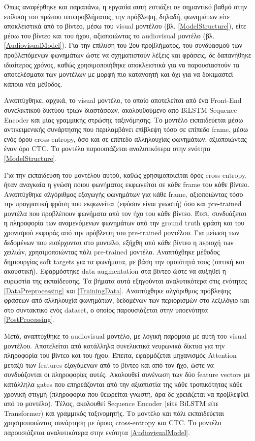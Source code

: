 Όπως αναφέρθηκε και παραπάνω, η εργασία αυτή εστιάζει σε σημαντικό βαθμό στην επίλυση του πρώτου υποπροβλήματος, την πρόβλεψη, δηλαδή, φωνημάτων είτε αποκλειστικά από το βίντεο, μέσω του visual μοντέλου (βλ. \ref{ModelStructure}), είτε μέσω του βίντεο και του ήχου, αξιοποιώντας το audiovisual μοντέλο (βλ. \ref{AudiovisualModel}). Για την επίλυση του 2ου προβλήματος, του συνδυασμού των προβλεπόμενων φωνημάτων ώστε να σχηματιστούν λέξεις και φράσεις, δε δαπανήθηκε ιδιαίτερος χρόνος, καθώς χρησιμοποιήθηκε αποκλειστικά για να παρουσιαστούν τα αποτελέσματα των μοντέλων με μορφή πιο κατανοητή και όχι για να δοκιμαστεί κάποια νέα μέθοδος.

Αναπτύχθηκε, αρχικά, το visual μοντέλο, το οποίο αποτελείται από ένα Front-End συνελικτικού δικτύου τριών διαστάσεων, ακολουθούμενο από BiLSTM Sequence Encoder και μίας γραμμικής στρώσης ταξινόμησης. Το μοντέλο εκπαιδεύεται μέσω αντικειμενικής συνάρτησης που περιλαμβάνει επίβλεψη τόσο σε επίπεδο frame, μέσω ενός όρου cross-entropy, όσο και σε επίπεδο αλληλουχίας φωνημάτων, αξιοποιώντας έναν όρο CTC. Το μοντέλο παρουσιάζεται αναλυτικότερα στην ενότητα \ref{ModelStructure}. 

Για την εκπαίδευση του μοντέλου αυτού, καθώς χρησιμοποιείται όρος cross-entropy, ήταν αναγκαία η γνώση ποιου φωνήματος εκφωνείται σε κάθε frame του κάθε βίντεο. Αναπτύχθηκε αλγόριθμος εξαγωγής φωνημάτων για κάθε frame, αξιοποιώντας τόσο την πραγματική φράση που εκφωνείται (εφόσον είναι γνωστή) όσο και pre-trained μοντέλα που προβλέπουν φωνήματα από τον ήχο του κάθε βίντεο. Έτσι, συνδυάζεται η πληροφορία των αναμενόμενων φωνημάτων από την ground truth φράση και του χρονισμού εκφοράς από την πρόβλεψη του pre-trained μοντέλου. Για μείωση των δεδομένων που εισέρχονται στο μοντέλο, εξήχθη από κάθε βίντεο η περιοχή των χειλιών, χρησιμοποιώντας πάλι pre-trained μοντέλα. Αναπτύχθηκε μέθοδος δημιουργίας soft targets για τα φωνήματα, με βάση την ομοιότητά τους (οπτική και ακουστική). Εφαρμόστηκε data augmentation στα βίντεο ώστε να αυξηθεί η ευρωστία της εκπαίδευσης. Τα βήματα αυτά εξηγούνται αναλυτικότερα στις ενότητες \ref{DataPreprocessing} και \ref{TrainingData}. Αναπτύχθηκε αλγόριθμος πρόβλεψης φράσεων από αλληλουχία φωνημάτων, δεδομένων των περιορισμών στο λεξιλόγιο και στο συντακτικό ενός dataset, ο οποίος παρουσιάζεται στην υποενότητα \ref{PostProcessing}.

Μετά, αναπτύχθηκε το audiovisual μοντέλο, με λογική παρόμοια με αυτή του visual μοντέλου. Αποτελείται από κατάλληλα συνελικτικά νευρωνικά δίκτυα για την πληροφορία του βίντεο και του ήχου. Έπειτα, εφαρμόζεται μηχανισμός Attention μεταξύ των features εξαγόμενων από το βίντεο και από τον ήχο, ώστε να συνδυάζονται οι πληροφορίες αυτές. Ακολουθεί συνένωση των δύο feature vectors με κατάλληλα gates που επηρεάζονται από την αξιοπιστία της κάθε τροπικότητας κάθε χρονική στιγμή (πληροφορία που θεωρείται γνωστή, άρα δε χρειάζεται να προβλεφθεί από το μοντέλο). Τέλος, ακολουθεί Sequence Encoder (είτε BiLSTM είτε Transformer) και γραμμικός ταξινομητής. Το μοντέλο και πάλι εκπαιδεύεται χρησιμοποιώντας συνάρτηση με όρους cross-entropy και CTC. Το μοντέλο παρουσιάζεται αναλυτικότερα στην ενότητα \ref{AudiovisualModel}. 

